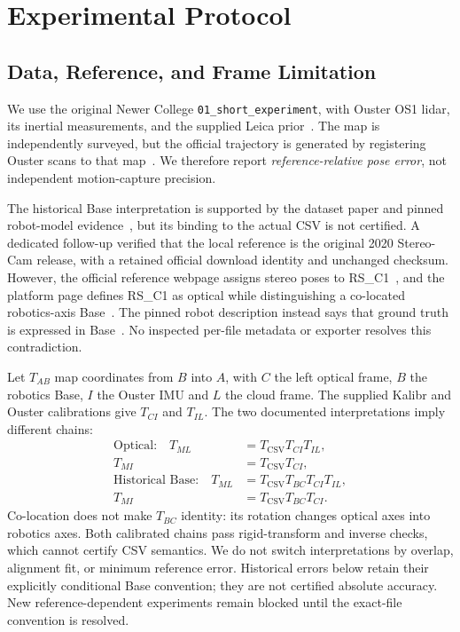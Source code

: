 \documentclass[journal,10pt,letterpaper]{IEEEtran}
\begin{document}
\section{Experimental Protocol}
\subsection{Data, Reference, and Frame Limitation}
We use the original Newer College \texttt{01\_short\_experiment}, with Ouster OS1 lidar, its inertial measurements, and the supplied Leica prior~\cite{newer,ncindex}. The map is independently surveyed, but the official trajectory is generated by registering Ouster scans to that map~\cite{ncref}. We therefore report \emph{reference-relative pose error}, not independent motion-capture precision.

The historical Base interpretation is supported by the dataset paper and pinned robot-model evidence~\cite{newer,ncframe}, but its binding to the actual CSV is not certified. A dedicated follow-up verified that the local reference is the original 2020 Stereo-Cam release, with a retained official download identity and unchanged checksum. However, the official reference webpage assigns stereo poses to RS\_C1~\cite{ncref}, and the platform page defines RS\_C1 as optical while distinguishing a co-located robotics-axis Base~\cite{ncplatform}. The pinned robot description instead says that ground truth is expressed in Base~\cite{ncframe}. No inspected per-file metadata or exporter resolves this contradiction.

Let $T_{A B}$ map coordinates from $B$ into $A$, with $C$ the left optical frame, $B$ the robotics Base, $I$ the Ouster IMU and $L$ the cloud frame. The supplied Kalibr and Ouster calibrations give $T_{C I}$ and $T_{I L}$. The two documented interpretations imply different chains:
\begin{align}
 \text{Optical:}\quad T_{M L}&=T_{\mathrm{CSV}}T_{C I}T_{I L},\nonumber\\
 T_{M I}&=T_{\mathrm{CSV}}T_{C I},\label{eq:opticalchain}\\
 \text{Historical Base:}\quad T_{M L}&=T_{\mathrm{CSV}}T_{B C}T_{C I}T_{I L},\nonumber\\
 T_{M I}&=T_{\mathrm{CSV}}T_{B C}T_{C I}.\label{eq:basechain}
\end{align}
Co-location does not make $T_{B C}$ identity: its rotation changes optical axes into robotics axes. Both calibrated chains pass rigid-transform and inverse checks, which cannot certify CSV semantics. We do not switch interpretations by overlap, alignment fit, or minimum reference error. Historical errors below retain their explicitly conditional Base convention; they are not certified absolute accuracy. New reference-dependent experiments remain blocked until the exact-file convention is resolved.
\end{document}
